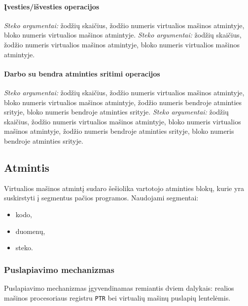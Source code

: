 \documentclass{scrartcl}
\begin{document}
                \paragraph{Įvesties/išvesties operacijos}
                    \emph{Steko argumentai:} žodžių skaičius, žodžio numeris virtualios mašinos atmintyje, bloko numeris virtualios mašinos atmintyje.
                    \emph{Steko argumentai:} žodžių skaičius, žodžio numeris virtualios mašinos atmintyje, bloko numeris virtualios mašinos atmintyje.
                \paragraph{Darbo su bendra atminties sritimi operacijos}
                    \emph{Steko argumentai:} žodžių skaičius, žodžio numeris virtualios mašinos atmintyje, bloko numeris virtualios mašinos atmintyje, žodžio numeris bendroje atminties srityje, bloko numeris bendroje atminties srityje.
                    \emph{Steko argumentai:} žodžių skaičius, žodžio numeris virtualios mašinos atmintyje, bloko numeris virtualios mašinos atmintyje, žodžio numeris bendroje atminties srityje, bloko numeris bendroje atminties srityje.
        \subsection{Atmintis}
            Virtualios mašinos atmintį sudaro šešiolika vartotojo atminties blokų, kurie yra suskirstyti į segmentus pačios programos. Naudojami segmentai:
            \begin{itemize}
                \item kodo,
                \item duomenų,
                \item steko.
            \end{itemize}
            \subsubsection{Puslapiavimo mechanizmas}
                Puslapiavimo mechanizmas įgyvendinamas remiantis dviem dalykais: realios mašinos procesoriaus registru \texttt{PTR} bei virtualių mašinų puslapių lentelėmis.
\end{document}
